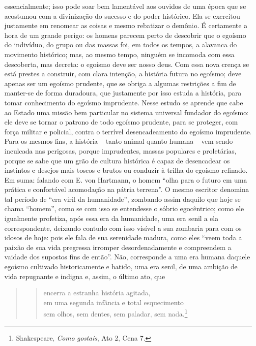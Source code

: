     essencialmente; isso pode soar bem lamentável aos ouvidos de uma
    época que se acostumou com a divinização do sucesso e do poder
    histórico. Ela se exercitou justamente em renomear as coisas e mesmo
    rebatizar o demônio. É certamente a hora de um grande perigo: os
    homens parecem perto de descobrir que o egoísmo do indivíduo, do
    grupo ou das massas foi, em todos os tempos, a alavanca do movimento
    histórico; mas, ao mesmo tempo, ninguém se incomoda com essa
    descoberta, mas decreta: o egoísmo deve ser nosso deus. Com essa
    nova crença se está prestes a construir, com clara intenção, a
    história futura no egoísmo; deve apenas ser um egoísmo prudente, que
    se obriga a algumas restrições a fim de manter-se de forma
    duradoura, que justamente por isso estuda a história, para tomar
    conhecimento do egoísmo imprudente. Nesse estudo se aprende que cabe
    ao Estado uma missão bem particular no sistema universal fundador do
    egoísmo: ele deve se tornar o patrono de todo egoísmo prudente, para
    se proteger, com força militar e policial, contra o terrível
    desencadeamento do egoísmo imprudente. Para os mesmos fins, a
    história -- tanto animal quanto humana -- vem sendo inculcada nas
    perigosas, porque imprudentes, massas populares e proletárias,
    porque se sabe que um grão de cultura histórica é capaz de
    desencadear os instintos e desejos mais toscos e brutos ou conduzir
    à trilha do egoísmo refinado. Em suma: falando com E. von Hartmann,
    o homem ``olha para o futuro em uma prática e confortável acomodação
    na pátria terrena''. O mesmo escritor denomina tal período de ``era
    viril da humanidade'', zombando assim daquilo que hoje se chama
    ``homem'', como se com isso se entendesse o sóbrio egocêntrico; como
    ele igualmente profetiza, após essa era da humanidade, uma era senil
    a ela correspondente, deixando contudo com isso visível a sua
    zombaria para com os idosos de hoje: pois ele fala de sua serenidade
    madura, como eles ``veem toda a paixão de sua vida pregressa
    irromper desordenadamente e compreendem a vaidade dos supostos fins
    de então''. Não, corresponde a uma era humana daquele egoísmo
    cultivado historicamente e batido, uma era senil, de uma ambição de
    vida repugnante e indigna e, assim, o último ato, que 

 \begin{quote}
 \begin{verse}
encerra a estranha história agitada,\\
em uma segunda infância e total esquecimento\\
sem olhos, sem dentes, sem paladar, sem nada.\footnote{Shakespeare,
  \emph{Como gostais}, Ato 2, Cena 7.}
 \end{verse}
 \end{quote}
  

